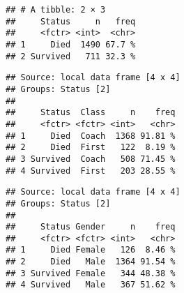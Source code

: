 \documentclass[]{book}
\newenvironment{Shaded}{\begin{snugshade}}{\end{snugshade}}
\newcommand{\KeywordTok}[1]{\textcolor[rgb]{0.13,0.29,0.53}{\textbf{{#1}}}}
\newcommand{\DataTypeTok}[1]{\textcolor[rgb]{0.13,0.29,0.53}{{#1}}}
\newcommand{\DecValTok}[1]{\textcolor[rgb]{0.00,0.00,0.81}{{#1}}}
\newcommand{\StringTok}[1]{\textcolor[rgb]{0.31,0.60,0.02}{{#1}}}
\newcommand{\CommentTok}[1]{\textcolor[rgb]{0.56,0.35,0.01}{\textit{{#1}}}}
\newcommand{\NormalTok}[1]{{#1}}
\begin{document}
\begin{verbatim}
## # A tibble: 2 × 3
##     Status     n   freq
##     <fctr> <int>  <chr>
## 1     Died  1490 67.7 %
## 2 Survived   711 32.3 %
\end{verbatim}

\begin{Shaded}
\end{Shaded}

\begin{verbatim}
## Source: local data frame [4 x 4]
## Groups: Status [2]
## 
##     Status  Class     n    freq
##     <fctr> <fctr> <int>   <chr>
## 1     Died  Coach  1368 91.81 %
## 2     Died  First   122  8.19 %
## 3 Survived  Coach   508 71.45 %
## 4 Survived  First   203 28.55 %
\end{verbatim}

\begin{Shaded}
\end{Shaded}

\begin{verbatim}
## Source: local data frame [4 x 4]
## Groups: Status [2]
## 
##     Status Gender     n    freq
##     <fctr> <fctr> <int>   <chr>
## 1     Died Female   126  8.46 %
## 2     Died   Male  1364 91.54 %
## 3 Survived Female   344 48.38 %
## 4 Survived   Male   367 51.62 %
\end{verbatim}
\end{document}
